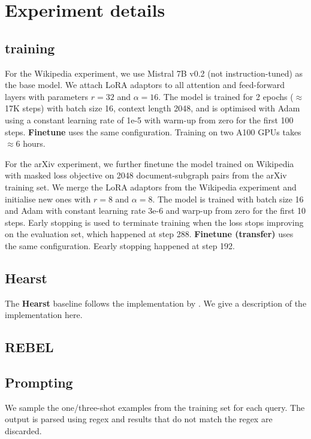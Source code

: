 \appendix

\chapter{Experiment details}  \label{appendix:exp-details}

\section{\name training}  \label{appendix:training-details}

For the Wikipedia experiment, we use Mistral 7B v0.2 (not instruction-tuned) \cite{jiang2023mistral} as the base model. We attach LoRA \cite{hu2021lora} adaptors to all attention and feed-forward layers with parameters $r=32$ and $\alpha=16$. The model is trained for 2 epochs ($\approx$ 17K steps) with batch size 16, context length 2048, and is optimised with Adam using a constant learning rate of 1e-5 with warm-up from zero for the first 100 steps. \textbf{Finetune} uses the same configuration. Training on two A100 GPUs takes $\approx 6$ hours.

For the arXiv experiment, we further finetune the model trained on Wikipedia with masked loss objective on 2048 document-subgraph pairs from the arXiv training set. We merge the LoRA adaptors from the Wikipedia experiment and initialise new ones with $r=8$ and $\alpha=8$. The model is trained with batch size 16 and Adam with constant learning rate 3e-6 and warp-up from zero for the first 10 steps. Early stopping is used to terminate training when the loss stops improving on the evaluation set, which happened at step 288. \textbf{Finetune (transfer)} uses the same configuration. Eearly stopping happened at step 192.



\section{Hearst}

The \textbf{Hearst} baseline follows the implementation by \citet{roller2018hearst}. We give a description of the implementation here. 

\section{REBEL}

\section{Prompting}
We sample the one/three-shot examples from the training set for each query. The output is parsed using regex and results that do not match the regex are discarded.

